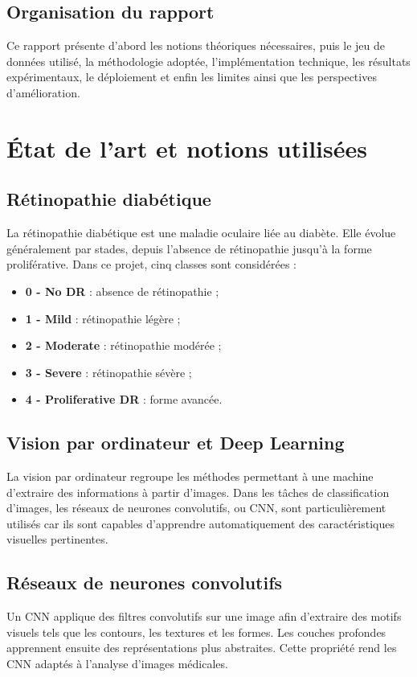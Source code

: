 \documentclass[12pt,a4paper]{report}
\begin{document}
\section{Organisation du rapport}
Ce rapport présente d'abord les notions théoriques nécessaires, puis le jeu de données utilisé, la méthodologie adoptée, l'implémentation technique, les résultats expérimentaux, le déploiement et enfin les limites ainsi que les perspectives d'amélioration.

\chapter{État de l'art et notions utilisées}

\section{Rétinopathie diabétique}
La rétinopathie diabétique est une maladie oculaire liée au diabète. Elle évolue généralement par stades, depuis l'absence de rétinopathie jusqu'à la forme proliférative. Dans ce projet, cinq classes sont considérées :
\begin{itemize}
    \item \textbf{0 - No DR} : absence de rétinopathie ;
    \item \textbf{1 - Mild} : rétinopathie légère ;
    \item \textbf{2 - Moderate} : rétinopathie modérée ;
    \item \textbf{3 - Severe} : rétinopathie sévère ;
    \item \textbf{4 - Proliferative DR} : forme avancée.
\end{itemize}

\section{Vision par ordinateur et Deep Learning}
La vision par ordinateur regroupe les méthodes permettant à une machine d'extraire des informations à partir d'images. Dans les tâches de classification d'images, les réseaux de neurones convolutifs, ou CNN, sont particulièrement utilisés car ils sont capables d'apprendre automatiquement des caractéristiques visuelles pertinentes.

\section{Réseaux de neurones convolutifs}
Un CNN applique des filtres convolutifs sur une image afin d'extraire des motifs visuels tels que les contours, les textures et les formes. Les couches profondes apprennent ensuite des représentations plus abstraites. Cette propriété rend les CNN adaptés à l'analyse d'images médicales.
\end{document}
